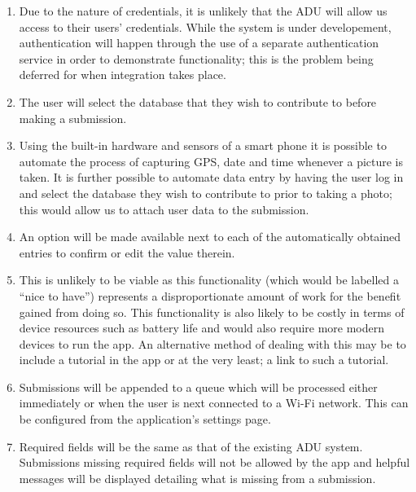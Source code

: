 \documentclass[
10pt, %
a4paper, %
oneside, %
headinclude,footinclude, %
BCOR5mm, %
]{scrartcl}
\begin{document}
\begin{enumerate}
\item Due to the nature of credentials, it is unlikely that the ADU will allow us access to their users' credentials. While the system is under developement, authentication will happen through the use of a separate authentication service in order to demonstrate functionality; this is the problem being deferred for when integration takes place.
\item The user will select the database that they wish to contribute to before making a submission.
\item Using the built-in hardware and sensors of a smart phone it is possible to automate the process of capturing GPS, date and time whenever a picture is taken. It is further possible to automate data entry by having the user log in and select the database they wish to contribute to prior to taking a photo; this would allow us to attach user data to the submission.
\item An option will be made available next to each of the automatically obtained entries to confirm or edit the value therein.
\item This is unlikely to be viable as this functionality (which would be labelled a ``nice to have'') represents a disproportionate amount of work for the benefit gained from doing so. This functionality is also likely to be costly in terms of device resources such as battery life and would also require more modern devices to run the app. An alternative method of dealing with this may be to include a tutorial in the app or at the very least; a link to such a tutorial.
\item Submissions will be appended to a queue which will be processed either immediately or when the user is next connected to a Wi-Fi network. This can be configured from the application's settings page.
\item Required fields will be the same as that of the existing ADU system. Submissions missing required fields will not be allowed by the app and helpful messages will be displayed detailing what is missing from a submission.
\end{enumerate}




% 


\end{document}
